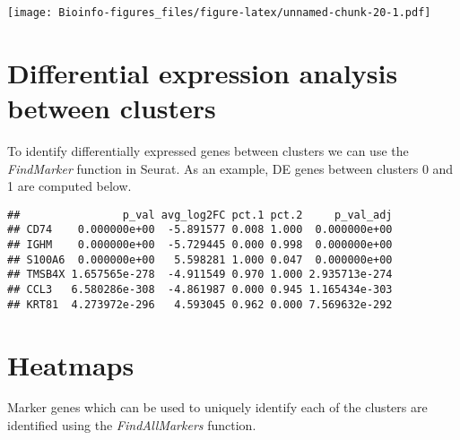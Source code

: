 \documentclass[
  openany]{book}
\newenvironment{Shaded}{\begin{snugshade}}{\end{snugshade}}
\newcommand{\AttributeTok}[1]{\textcolor[rgb]{0.77,0.63,0.00}{#1}}
\newcommand{\DecValTok}[1]{\textcolor[rgb]{0.00,0.00,0.81}{#1}}
\newcommand{\FunctionTok}[1]{\textcolor[rgb]{0.00,0.00,0.00}{#1}}
\newcommand{\NormalTok}[1]{#1}
\newcommand{\OtherTok}[1]{\textcolor[rgb]{0.56,0.35,0.01}{#1}}
\newcommand{\SpecialCharTok}[1]{\textcolor[rgb]{0.00,0.00,0.00}{#1}}
\begin{document}
\texttt{[image: Bioinfo-figures\_files/figure-latex/unnamed-chunk-20-1.pdf]}

\clearpage

\hypertarget{differential-expression-analysis-between-clusters}{%
\section{Differential expression analysis between clusters}\label{differential-expression-analysis-between-clusters}}

To identify differentially expressed genes between clusters we can use the \emph{FindMarker} function in Seurat. As an example, DE genes between clusters 0 and 1 are computed below.

\begin{Shaded}
\end{Shaded}

\begin{verbatim}
##                p_val avg_log2FC pct.1 pct.2     p_val_adj
## CD74    0.000000e+00  -5.891577 0.008 1.000  0.000000e+00
## IGHM    0.000000e+00  -5.729445 0.000 0.998  0.000000e+00
## S100A6  0.000000e+00   5.598281 1.000 0.047  0.000000e+00
## TMSB4X 1.657565e-278  -4.911549 0.970 1.000 2.935713e-274
## CCL3   6.580286e-308  -4.861987 0.000 0.945 1.165434e-303
## KRT81  4.273972e-296   4.593045 0.962 0.000 7.569632e-292
\end{verbatim}

\clearpage

\hypertarget{heatmaps-1}{%
\section{Heatmaps}\label{heatmaps-1}}

Marker genes which can be used to uniquely identify each of the clusters are identified using the \emph{FindAllMarkers} function.
\end{document}
